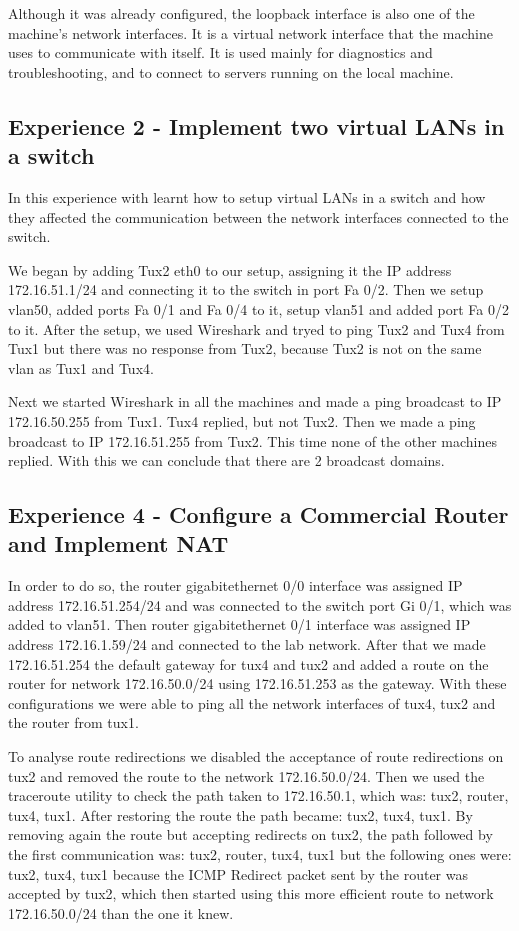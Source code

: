 \documentclass[11pt,a4paper,reqno]{article}
\numberwithin{equation}{section}
\begin{document}
Although it was already configured, the loopback interface is also one of the machine’s network interfaces. It is a virtual network interface that the machine uses to communicate with itself. It is used mainly for diagnostics and troubleshooting, and to connect to servers running on the local machine.

\subsection{Experience 2 - Implement two virtual LANs in a switch}

In this experience with learnt how to setup virtual LANs in a switch and how they affected the communication between the network interfaces connected to the switch.

We began by adding Tux2 eth0 to our setup, assigning it the IP address 172.16.51.1/24 and connecting it to the switch in port Fa 0/2. Then we setup vlan50, added ports Fa 0/1 and Fa 0/4 to it, setup vlan51 and added port Fa 0/2 to it.
After the setup, we used Wireshark and tryed to ping Tux2 and Tux4  from Tux1 but there was no response from Tux2, because Tux2 is not on the same vlan as Tux1 and Tux4.

Next we started Wireshark in all the machines and made a ping broadcast to IP 172.16.50.255 from Tux1. Tux4 replied, but not Tux2. Then we made a ping broadcast to IP 172.16.51.255 from Tux2. This time none of the other machines replied. With this we can conclude that there are 2 broadcast domains.

\subsection{Experience 4 - Configure a Commercial Router and Implement NAT}

In order to do so, the router gigabitethernet 0/0 interface was assigned IP address 172.16.51.254/24 and was connected to the switch port Gi 0/1, which was added to vlan51. Then router gigabitethernet 0/1 interface was assigned IP address 172.16.1.59/24 and connected to the lab network. After that we made 172.16.51.254 the default gateway for tux4 and tux2 and added a route on the router for network 172.16.50.0/24 using 172.16.51.253 as the gateway. With these configurations we were able to ping all the network interfaces of tux4, tux2 and the router from tux1.

To analyse route redirections we disabled the acceptance of route redirections on tux2 and removed the route to the network 172.16.50.0/24. Then we used the traceroute utility to check the path taken to 172.16.50.1, which was: tux2, router, tux4, tux1. After restoring the route the path became: tux2, tux4, tux1. By removing again the route but accepting redirects on tux2, the path followed by the first communication was: tux2, router, tux4, tux1 but the following ones were: tux2, tux4, tux1 because the ICMP Redirect packet sent by the router was accepted by tux2, which then started using this more efficient route to network 172.16.50.0/24 than the one it knew.
\end{document}

